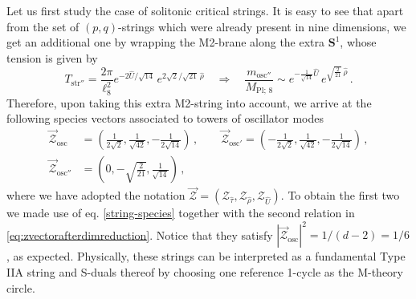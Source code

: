 %
%

Let us first study the case of solitonic critical strings. It is easy to see that apart from the set of $(p,q)$-strings which were already present in nine dimensions, we get an additional one by wrapping the M2-brane along the extra $\mathbf{S}^1$, whose tension is given by
%
\begin{equation}\label{eq:8dstring}
	T_{\text{str}''} =  \frac{2\pi}{\ell_8^2} e^{-2\hat U/\sqrt{14}}\, e^{2\sqrt{2}/\sqrt{21}\, \hat \rho} \quad \Longrightarrow \quad \frac{m_{\text{osc}''}}{M_{\text{Pl};\, 8}}  \sim e^{-\frac{1}{\sqrt{14}}\hat U}\, e^{\sqrt{\frac{2}{21}}\, \hat \rho}\, .
\end{equation}
%
Therefore, upon taking this extra M2-string into account, we arrive at the following species vectors associated to towers of oscillator modes
%
\begin{equation} \label{eq:stringvectors}
\begin{split} 
	\vec{\mathcal{Z}}_{\text{osc}} &= \left( \frac{1}{2\sqrt{2}} , \frac{1}{\sqrt{42}}, -\frac{1}{2 \sqrt{14}} \right)\, , \qquad \vec{\mathcal{Z}}_{\text{osc}'} = \left( -\frac{1}{2\sqrt{2}} , \frac{1}{\sqrt{42}}, -\frac{1}{2 \sqrt{14}} \right) \, ,\\
	\vec{\mathcal{Z}}_{\text{osc}''} &= \left( 0 , -\sqrt{\frac{2}{21}}, \frac{1}{\sqrt{14}} \right) \, ,
\end{split}
\end{equation}
%
where we have adopted the notation $\vec{\mathcal{Z}} = \left(\mathcal{Z}_{\hat \tau}, \mathcal{Z}_{\hat \rho}, \mathcal{Z}_{\hat U} \right)$. To obtain the first two we made use of eq. \eqref{string-species} together with the second relation in \eqref{eq:zvectorafterdimreduction}. Notice that they satisfy $|\vec{\mathcal{Z}}_{\text{osc}}|^2=1/(d-2)=1/6$, as expected. Physically, these strings can be interpreted as a fundamental Type IIA string and S-duals thereof by choosing one reference 1-cycle as the M-theory circle.

